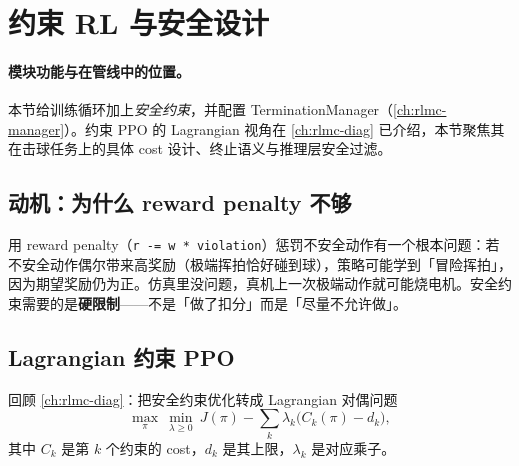 \section{约束 RL 与安全设计}
\label{sec:rlmc-strike-safety}

\paragraph{模块功能与在管线中的位置。}本节给训练循环加上\emph{安全约束}，并配置 TerminationManager（\cref{ch:rlmc-manager}）。约束 PPO 的 Lagrangian 视角在 \cref{ch:rlmc-diag} 已介绍，本节聚焦其在击球任务上的具体 cost 设计、终止语义与推理层安全过滤。

\subsection{动机：为什么 reward penalty 不够}

用 reward penalty（\verb|r -= w * violation|）惩罚不安全动作有一个根本问题：若不安全动作偶尔带来高奖励（极端挥拍恰好碰到球），策略可能学到「冒险挥拍」，因为期望奖励仍为正。仿真里没问题，真机上一次极端动作就可能烧电机。安全约束需要的是\textbf{硬限制}——不是「做了扣分」而是「尽量不允许做」。

\subsection{Lagrangian 约束 PPO}

回顾 \cref{ch:rlmc-diag}：把安全约束优化转成 Lagrangian 对偶问题
\begin{equation}
\max_{\pi}\ \min_{\lambda\ge 0}\ J(\pi) - \sum_{k}\lambda_k\bigl(C_k(\pi) - d_k\bigr),
\label{eq:rlmc-strike-lagrangian}
\end{equation}
其中 $C_k$ 是第 $k$ 个约束的 cost，$d_k$ 是其上限，$\lambda_k$ 是对应乘子。

